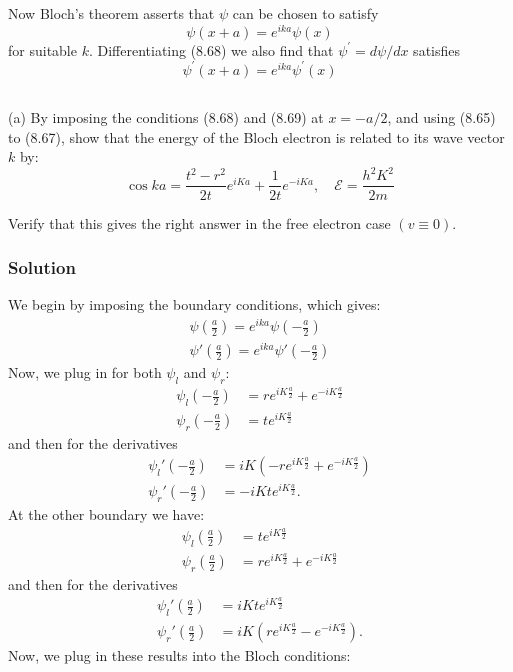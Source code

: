 \documentclass[12pt]{article}
\begin{document}
Now Bloch's theorem asserts that $\psi$ can be chosen to satisfy
$$
\psi(x+a)=e^{i k a} \psi(x)
$$
for suitable $k$. Differentiating (8.68) we also find that $\psi^{\prime}=d \psi / d x$ satisfies
$$
\psi^{\prime}(x+a)=e^{i k a} \psi^{\prime}(x)
$$
\subsection{}
(a) By imposing the conditions (8.68) and (8.69) at $x=-a / 2$, and using (8.65) to (8.67), show that the energy of the Bloch electron is related to its wave vector $k$ by:
$$
\cos k a=\frac{t^2-r^2}{2 t} e^{i K a}+\frac{1}{2 t} e^{-i K a}, \quad \mathcal{E}=\frac{h^2 K^2}{2 m}
$$

Verify that this gives the right answer in the free electron case $(v \equiv 0)$.
\subsubsection{Solution}
We begin by imposing the boundary conditions, which gives:
\begin{align}
    \psi(\frac{a}{2}) = e^{ika}\psi(-\frac{a}{2}) \\
    \psi'(\frac{a}{2}) = e^{ika}\psi'(-\frac{a}{2})
\end{align}
Now, we plug in for both $\psi_l$ and $\psi_r$:
\begin{align}
    \psi_l(-\frac{a}{2}) &= re^{iK\frac{a}{2}} + e^{-iK\frac{a}{2}} \\
    \psi_r(-\frac{a}{2}) &= te^{iK\frac{a}{2}}
\end{align}
and then for the derivatives
\begin{align}
    \psi_l'(-\frac{a}{2}) &= iK\left(-re^{iK\frac{a}{2}} + e^{-iK\frac{a}{2}}\right) \\
    \psi_r'(-\frac{a}{2}) &= -iKte^{iK\frac{a}{2}}.
\end{align}
At the other boundary we have:
\begin{align}
    \psi_l(\frac{a}{2}) &= t e^{iK\frac{a}{2}} \\
    \psi_r(\frac{a}{2}) &= re^{iK\frac{a}{2}} + e^{-iK\frac{a}{2}}
\end{align}
and then for the derivatives
\begin{align}
    \psi_l'(\frac{a}{2}) &= iKte^{iK\frac{a}{2}} \\
    \psi_r'(\frac{a}{2}) &= iK\left(re^{iK\frac{a}{2}} - e^{-iK\frac{a}{2}}\right).
\end{align}
Now, we plug in these results into the Bloch conditions:
\end{document}
